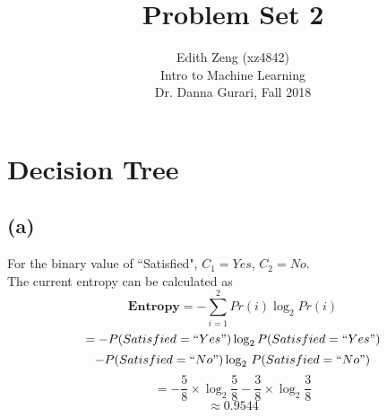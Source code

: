 \documentclass{article}
\title{Problem Set 2}
\author{Edith Zeng (xz4842)\\Intro to Machine Learning\\Dr. Danna Gurari, Fall 2018}
\begin{document}
\maketitle

\section{Decision Tree}
\subsection{(a)}
For the binary value of ``Satisfied", $C_1 = Yes$, $C_2 = No.$
\\
The current entropy can be calculated as 
\[ \boldsymbol{Entropy} = - \sum_{i=1}^2Pr(i)\log_{2}Pr(i) \] \[
= -P(Satisfied=``Yes")\log_{2}P(Satisfied=``Yes") \]\[- P(Satisfied=``No")\log_{2}\,P(Satisfied=``No")
\]
\[
= -\frac{5}{8}\times \log_{2}\frac{5}{8}-\frac{3}{8}\times \log_{2}\frac{3}{8} 
\]
\[\approx 0.9544
\]
\end{document}

